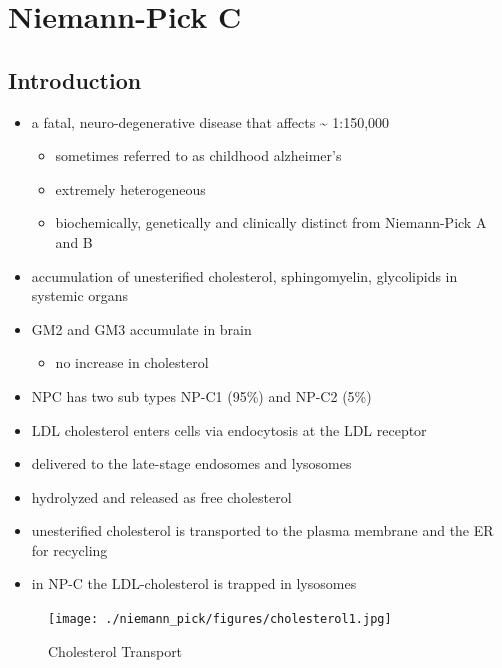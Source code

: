\documentclass{scrartcl}
\begin{document}
\section{Niemann-Pick C}
\label{sec:org89d382d}
\subsection{Introduction}
\label{sec:org1bf5a05}
\begin{itemize}
\item a fatal, neuro-degenerative disease that affects \textasciitilde{} 1:150,000
\begin{itemize}
\item sometimes referred to as childhood alzheimer’s
\item extremely heterogeneous
\item biochemically, genetically and clinically distinct from Niemann-Pick A and B
\end{itemize}
\item accumulation of unesterified cholesterol, sphingomyelin, glycolipids in systemic organs
\item GM2 and GM3 accumulate in brain
\begin{itemize}
\item no increase in cholesterol
\end{itemize}
\item NPC has two sub types NP-C1 (95\%) and NP-C2 (5\%)

\item LDL cholesterol enters cells via endocytosis at the LDL receptor
\item delivered to the late-stage endosomes and lysosomes
\item hydrolyzed and released as free cholesterol
\item unesterified cholesterol is transported to the plasma membrane and the ER for recycling

\item in NP-C the LDL-cholesterol is trapped in lysosomes
\end{itemize}

\begin{figure}[htbp]
\centering
\texttt{[image: ./niemann\_pick/figures/cholesterol1.jpg]}
\caption{\label{fig:orgeee5bb1}
Cholesterol Transport}
\end{figure}
\end{document}
